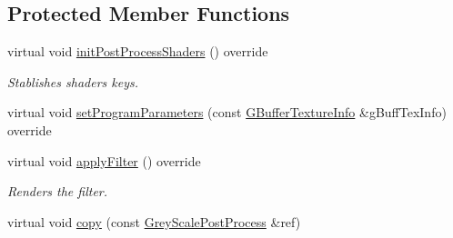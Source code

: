 \subsection*{Protected Member Functions}
\begin{DoxyCompactItemize}
\item 
\mbox{\label{class_geometry_engine_1_1_geometry_post_process_1_1_single_pass_post_process_1_1_grey_scale_post_process_a17e5445c69b1e2f975603ba84d9b03b6}} 
virtual void \mbox{\hyperlink{class_geometry_engine_1_1_geometry_post_process_1_1_single_pass_post_process_1_1_grey_scale_post_process_a17e5445c69b1e2f975603ba84d9b03b6}{init\+Post\+Process\+Shaders}} () override
\begin{DoxyCompactList}\small\item\em Stablishes shaders keys. \end{DoxyCompactList}\item 
virtual void \mbox{\hyperlink{class_geometry_engine_1_1_geometry_post_process_1_1_single_pass_post_process_1_1_grey_scale_post_process_ab60a2926e4d28cb0b808a3e01bbe85d3}{set\+Program\+Parameters}} (const \mbox{\hyperlink{class_geometry_engine_1_1_g_buffer_texture_info}{G\+Buffer\+Texture\+Info}} \&g\+Buff\+Tex\+Info) override
\item 
\mbox{\label{class_geometry_engine_1_1_geometry_post_process_1_1_single_pass_post_process_1_1_grey_scale_post_process_abfa5e2162bb4300ec4fea1b36873d786}} 
virtual void \mbox{\hyperlink{class_geometry_engine_1_1_geometry_post_process_1_1_single_pass_post_process_1_1_grey_scale_post_process_abfa5e2162bb4300ec4fea1b36873d786}{apply\+Filter}} () override
\begin{DoxyCompactList}\small\item\em Renders the filter. \end{DoxyCompactList}\item 
virtual void \mbox{\hyperlink{class_geometry_engine_1_1_geometry_post_process_1_1_single_pass_post_process_1_1_grey_scale_post_process_ae22e2bf8dc5b553a7b1526b695c8be88}{copy}} (const \mbox{\hyperlink{class_geometry_engine_1_1_geometry_post_process_1_1_single_pass_post_process_1_1_grey_scale_post_process}{Grey\+Scale\+Post\+Process}} \&ref)
\end{DoxyCompactItemize}
